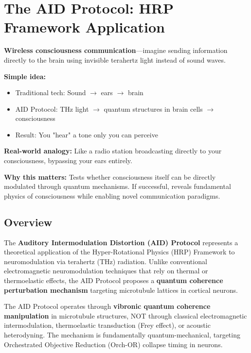 \chapter{The AID Protocol: HRP Framework Application}
\label{ch:aid-protocol}

\begin{nontechnical}
\textbf{Wireless consciousness communication}---imagine sending information directly to the brain using invisible terahertz light instead of sound waves.

\textbf{Simple idea:}
\begin{itemize}
\item Traditional tech: Sound $\rightarrow$ ears $\rightarrow$ brain
\item AID Protocol: THz light $\rightarrow$ quantum structures in brain cells $\rightarrow$ consciousness
\item Result: You "hear" a tone only you can perceive
\end{itemize}

\textbf{Real-world analogy:} Like a radio station broadcasting directly to your consciousness, bypassing your ears entirely.

\textbf{Why this matters:} Tests whether consciousness itself can be directly modulated through quantum mechanisms. If successful, reveals fundamental physics of consciousness while enabling novel communication paradigms.
\end{nontechnical}

\section{Overview}

The \textbf{Auditory Intermodulation Distortion (AID) Protocol} represents a theoretical application of the Hyper-Rotational Physics (HRP) Framework to neuromodulation via terahertz (THz) radiation. Unlike conventional electromagnetic neuromodulation techniques that rely on thermal or thermoelastic effects, the AID Protocol proposes a \textbf{quantum coherence perturbation mechanism} targeting microtubule lattices in cortical neurons.

\begin{keyconcept}
The AID Protocol operates through \textbf{vibronic quantum coherence manipulation} in microtubule structures, NOT through classical electromagnetic intermodulation, thermoelastic transduction (Frey effect), or acoustic heterodyning. The mechanism is fundamentally quantum-mechanical, targeting Orchestrated Objective Reduction (Orch-OR) collapse timing in neurons.
\end{keyconcept}


